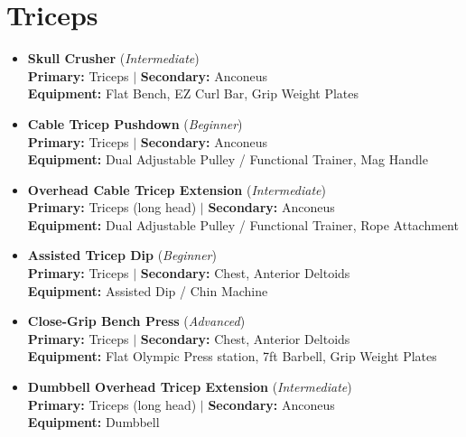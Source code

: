 \documentclass[11pt,a4paper]{article}
\begin{document}
\section*{Triceps}
\begin{itemize}[leftmargin=*]
  \item \textbf{Skull Crusher} (\textit{Intermediate})\\
        \textbf{Primary:} Triceps $|$ \textbf{Secondary:} Anconeus\\
        \textbf{Equipment:} Flat Bench, EZ Curl Bar, Grip Weight Plates
  \item \textbf{Cable Tricep Pushdown} (\textit{Beginner})\\
        \textbf{Primary:} Triceps $|$ \textbf{Secondary:} Anconeus\\
        \textbf{Equipment:} Dual Adjustable Pulley / Functional Trainer, Mag Handle
  \item \textbf{Overhead Cable Tricep Extension} (\textit{Intermediate})\\
        \textbf{Primary:} Triceps (long head) $|$ \textbf{Secondary:} Anconeus\\
        \textbf{Equipment:} Dual Adjustable Pulley / Functional Trainer, Rope Attachment
  \item \textbf{Assisted Tricep Dip} (\textit{Beginner})\\
        \textbf{Primary:} Triceps $|$ \textbf{Secondary:} Chest, Anterior Deltoids\\
        \textbf{Equipment:} Assisted Dip / Chin Machine
  \item \textbf{Close-Grip Bench Press} (\textit{Advanced})\\
        \textbf{Primary:} Triceps $|$ \textbf{Secondary:} Chest, Anterior Deltoids\\
        \textbf{Equipment:} Flat Olympic Press station, 7ft Barbell, Grip Weight Plates
  \item \textbf{Dumbbell Overhead Tricep Extension} (\textit{Intermediate})\\
        \textbf{Primary:} Triceps (long head) $|$ \textbf{Secondary:} Anconeus\\
        \textbf{Equipment:} Dumbbell
\end{itemize}
\vspace{0.5em}
\end{document}
